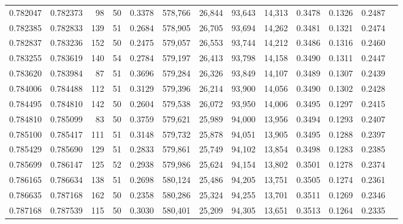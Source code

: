 \begin{tabular}{rrrrrrrrrrrrr}
0.782047 & 0.782373 &    98 &  50 &                                     0.3378 & 578,766 &  26,844 &  93,643 &  14,313 & 0.3478 & 0.1326 & 0.2487 \\
0.782385 & 0.782833 &   139 &  51 &                                     0.2684 & 578,905 &  26,705 &  93,694 &  14,262 & 0.3481 & 0.1321 & 0.2474 \\
0.782837 & 0.783236 &   152 &  50 &                                     0.2475 & 579,057 &  26,553 &  93,744 &  14,212 & 0.3486 & 0.1316 & 0.2460 \\
0.783255 & 0.783619 &   140 &  54 &                                     0.2784 & 579,197 &  26,413 &  93,798 &  14,158 & 0.3490 & 0.1311 & 0.2447 \\
0.783620 & 0.783984 &    87 &  51 &                                     0.3696 & 579,284 &  26,326 &  93,849 &  14,107 & 0.3489 & 0.1307 & 0.2439 \\
0.784006 & 0.784488 &   112 &  51 &                                     0.3129 & 579,396 &  26,214 &  93,900 &  14,056 & 0.3490 & 0.1302 & 0.2428 \\
0.784495 & 0.784810 &   142 &  50 &                                     0.2604 & 579,538 &  26,072 &  93,950 &  14,006 & 0.3495 & 0.1297 & 0.2415 \\
0.784810 & 0.785099 &    83 &  50 &                                     0.3759 & 579,621 &  25,989 &  94,000 &  13,956 & 0.3494 & 0.1293 & 0.2407 \\
0.785100 & 0.785417 &   111 &  51 &                                     0.3148 & 579,732 &  25,878 &  94,051 &  13,905 & 0.3495 & 0.1288 & 0.2397 \\
0.785429 & 0.785690 &   129 &  51 &                                     0.2833 & 579,861 &  25,749 &  94,102 &  13,854 & 0.3498 & 0.1283 & 0.2385 \\
0.785699 & 0.786147 &   125 &  52 &                                     0.2938 & 579,986 &  25,624 &  94,154 &  13,802 & 0.3501 & 0.1278 & 0.2374 \\
0.786165 & 0.786634 &   138 &  51 &                                     0.2698 & 580,124 &  25,486 &  94,205 &  13,751 & 0.3505 & 0.1274 & 0.2361 \\
0.786635 & 0.787168 &   162 &  50 &                                     0.2358 & 580,286 &  25,324 &  94,255 &  13,701 & 0.3511 & 0.1269 & 0.2346 \\
0.787168 & 0.787539 &   115 &  50 &                                     0.3030 & 580,401 &  25,209 &  94,305 &  13,651 & 0.3513 & 0.1264 & 0.2335 \\

\end{tabular}
